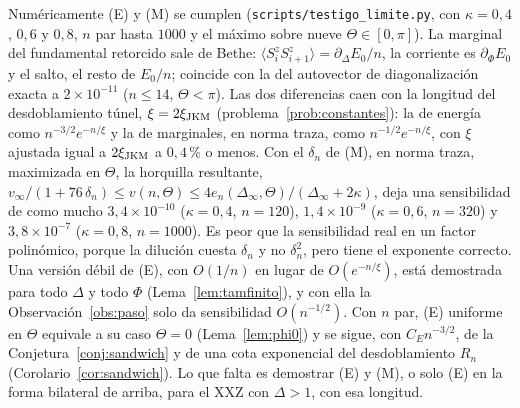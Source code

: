 \documentclass[11pt,a4paper]{article}
\theoremstyle{remark}
\newcommand{\ev}[1]{\langle #1\rangle}
\begin{document}
\begin{enumerate}
  Numéricamente (E) y (M) se cumplen (\texttt{scripts/testigo\_limite.py}, con $\kappa=0{,}4$,
  $0{,}6$ y $0{,}8$, $n$ par hasta $1000$ y el máximo sobre nueve $\Theta\in[0,\pi]$). La marginal
  del fundamental retorcido sale de Bethe: $\ev{S^z_iS^z_{i+1}}=\partial_\Delta E_0/n$, la
  corriente es $\partial_\Phi E_0$ y el salto, el resto de $E_0/n$; coincide con la del autovector de
  diagonalización exacta a $2\times10^{-11}$ ($n\le14$, $\Theta<\pi$). Las dos diferencias caen con
  la longitud del desdoblamiento túnel, $\xi=2\xi_{\rm JKM}$ (problema~\ref{prob:constantes}): la de energía como
  $n^{-3/2}e^{-n/\xi}$ y la de marginales, en norma traza, como $n^{-1/2}e^{-n/\xi}$, con $\xi$
  ajustada igual a $2\xi_{\rm JKM}$ a $0{,}4$\,\% o menos. Con el $\delta_n$ de (M), en
  norma traza, maximizada en $\Theta$, la horquilla resultante,
  $v_\infty/(1+76\,\delta_n)\le v(n,\Theta)\le4e_n(\Delta_\infty,\Theta)/(\Delta_\infty+2\kappa)$,
  deja una sensibilidad de como mucho $3{,}4\times10^{-10}$ ($\kappa=0{,}4$, $n=120$),
  $1{,}4\times10^{-9}$ ($\kappa=0{,}6$, $n=320$) y $3{,}8\times10^{-7}$ ($\kappa=0{,}8$, $n=1000$).
  Es peor que la sensibilidad real en un factor polinómico, porque la dilución cuesta $\delta_n$ y
  no $\delta_n^2$, pero tiene el exponente correcto. Una versión débil de (E), con $O(1/n)$ en lugar de $O(e^{-n/\xi})$, está demostrada para todo $\Delta$ y todo $\Phi$ (Lema~\ref{lem:tamfinito}), y con ella la Observación~\ref{obs:paso} solo da sensibilidad $O(n^{-1/2})$. Con $n$ par, (E) uniforme en $\Theta$ equivale a su caso $\Theta=0$ (Lema~\ref{lem:phi0}) y se sigue, con $C_En^{-3/2}$, de la Conjetura~\ref{conj:sandwich} y de una cota exponencial del desdoblamiento $R_n$ (Corolario~\ref{cor:sandwich}). Lo que falta es demostrar (E) y (M), o solo (E) en la forma bilateral de arriba, para el XXZ
  con $\Delta>1$, con esa longitud.


\end{enumerate}
\end{document}
